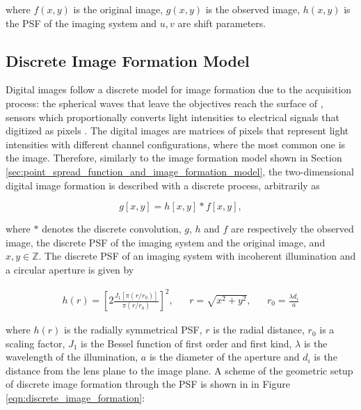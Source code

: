 \noindent where $f(x,y)$ is the original image, $g(x,y)$ is the observed image, $h(x,y)$ is the PSF of the imaging system and $u,v$ are shift parameters.

\subsection{Discrete Image Formation Model}

Digital images follow a discrete model for image formation due to the acquisition process: the spherical waves that leave the objectives reach the surface of , sensors which proportionally converts light intensities to electrical signals that digitized as pixels \cite{gonzalez2018digital}. The digital images are matrices of pixels that represent light intensities with different channel configurations, where the most common one is the  image. Therefore, similarly to the image formation model shown in Section \ref{sec:point_spread_function_and_image_formation_model}, the two-dimensional digital image formation is described with a discrete process, arbitrarily as

\begin{equation}
\label{eqn:discrete_image_formation}
g[x,y] = h[x,y] \ast f[x,y],
\end{equation}

\noindent where $\ast$ denotes the discrete convolution, $g$, $h$ and $f$ are respectively the observed image, the discrete PSF of the imaging system and the original image, and $x,y \in \mathbb{Z}$. The discrete PSF of an imaging system with incoherent illumination and a circular aperture is given by

\begin{align}
\label{eqn:discrete_psf}
h(r) = \left[
        2
        \frac{J_{1}[\pi (r / r_{0})]}{\pi (r / r_{0})}
       \right]^{2},
&&
r = \sqrt{x^{2} + y^{2}},
&&
r_{0} = \frac{\lambda d_{i}}{a}
\end{align}

\noindent where $h(r)$ is the radially symmetrical PSF, $r$ is the radial distance, $r_{0}$ is a scaling factor, $J_{1}$ is the Bessel function of first order and first kind, $\lambda$ is the wavelength of the illumination, $a$ is the diameter of the aperture and $d_{i}$ is the distance from the lens plane to the image plane. A scheme of the geometric setup of discrete image formation through the PSF is shown in in Figure \ref{eqn:discrete_image_formation}: 

